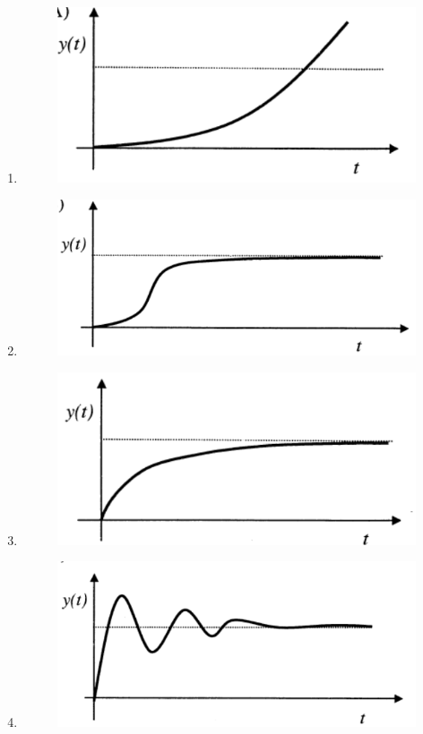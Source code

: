 \documentclass[a4paper, 11pt]{article}
\begin{document}
\begin{enumerate}
    \begin{enumerate}
        \item \begin{figure}[H] \centering \includegraphics[width=0.4\columnwidth]{figs/q3A.png} \caption*{} \label{fig:a3A} \end{figure}
        \item \begin{figure}[H] \centering \includegraphics[width=0.4\columnwidth]{figs/q3B.png} \caption*{} \label{fig:a3B} \end{figure}
        \item \begin{figure}[H] \centering \includegraphics[width=0.4\columnwidth]{figs/q3C.png} \caption*{} \label{fig:a3C} \end{figure}
        \item \begin{figure}[H] \centering \includegraphics[width=0.4\columnwidth]{figs/q3D.png} \caption*{} \label{fig:a3D} \end{figure}
    \end{enumerate}

    \hfill{}


\end{enumerate}
\end{document}
